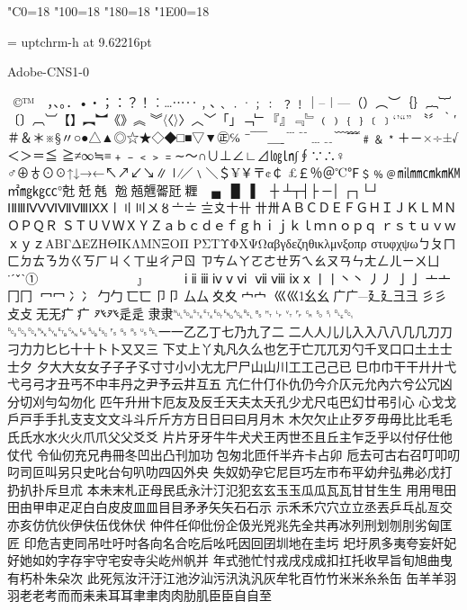%
%
%
%
\kcatcode"C0=18%
\kcatcode"100=18%
\kcatcode"180=18%
\kcatcode"1E00=18%

\font\uptchrm = uptchrm-h at 9.62216pt
\uptchrm


Adobe-CNS1-0

 ©™　，、。．•‧；：？！︰…⋯‥﹐､﹑﹒·﹔﹕
﹖﹗｜–︱—（）︵︶｛｝︷︸〔〕︹︺【】︻︼《》︽
︾〈〈〉〉︿﹀「」﹁﹂『』﹃﹄﹙﹚﹛﹜﹝﹞‘’“”
〝〞‵′＃＆＊※§〃○●△▲◎☆★◇◆□■▽▼㊣℅
¯̄‾￣＿ˍ﹉﹊﹍﹎﹋﹌﹟﹠﹡＋－×÷±√＜＞＝≦
≧≠∞≒≡﹢﹣﹤﹥﹦∼～∩∪⊥∠∟⊿㏒㏑∫∮∵∴♀
♂⊕♁⊙☉↑↓→←↖↗↙↘∥∣∕／﹨＼＄¥￥〒¢￠
£￡％＠℃℉﹩﹪﹫㏕㎜㎝㎞㏎㎡㎎㎏㏄°兙兛兞
兝兡兣嗧瓩糎▁▂▃▄▅▆▇█▏▎▍▌▋▊▉┼
┴┬┤├▔─│▕┌┐└┘╭╮╰╯◢◣◥◤╱╲╳０１
２３４５６７８９ⅠⅡⅢⅣⅤⅥⅦⅧⅨⅩ〡〢〣〤〥〦〧
〨〩〸卄〹〺ＡＢＣＤＥＦＧＨＩＪＫＬＭＮＯＰＱＲ
ＳＴＵＶＷＸＹＺａｂｃｄｅｆｇｈｉｊｋｌｍｎｏｐｑ
ｒｓｔｕｖｗｘｙｚΑΒΓΔΕΖΗΘΙΚΛΜΝΞΟΠ
ΡΣΤΥΦΧΨΩαβγδεζηθικλμνξοπρ
στυφχψωㄅㄆㄇㄈㄉㄊㄋㄌㄍㄎㄏㄐㄑㄒㄓㄔㄕㄖ
ㄗㄘㄙㄚㄛㄜㄝㄞㄟㄠㄡㄢㄣㄤㄥㄦㄧㄨㄩ˙ˊˇ̌ˋ①
②③④⑤⑥⑦⑧⑨⑩⑴⑵⑶
⑷⑸⑹⑺⑻⑼⑽ⅰⅱⅲⅳⅴⅵ
ⅶⅷⅸⅹ丨⼁丶⼂丿⼃⼅亅⼇亠冂⼌
冖⼍冫⼎⼓勹⼖匸⼙卩⼛厶⼢夊⼧宀
⼮巛幺⼳广⼴廴⼵彐⼹彡⼺⽁攴⽆无疒⽧
癶⽨⾡辵⾪隶␀␁␂␃␄␅␆␇␈␉␊␋␌␍␎␏␐␑
␒␓␔␕␖␗␘␙␚␛␜␝␞␟␡⼀一⼄乙丁七乃九了⼆
二人⼈儿⼉入⼊八⼋⼏几⼑刀刁⼒力⼔匕十⼗卜⼘⼜又三
下丈上丫丸凡久么也乞于亡兀兀刃勺千叉⼝口土⼟士⼠夕
⼣大⼤女⼥⼦子孑孓寸⼨小⼩尢⼪尸⼫⼭山川工⼯⼰己已
巳巾⼱干⼲廾⼶弋⼷弓⼸才丑丐不中丰丹之尹予云井互五
亢仁什仃仆仇仍今介仄元允內六兮公冗凶分切刈勻勾勿化
匹午升卅卞厄友及反壬天夫太夭孔少尤尺屯巴幻廿弔引心
⼼戈⼽戶⼾手⼿扎⽀支文⽂斗⽃斤⽄方⽅日⽇曰⽈月⽉木
⽊欠⽋止⽌歹⽍毋⽏比⽐毛⽑氏⽒水⽔火⽕爪⽖父⽗爻⽘
片⽚牙⽛牛⽜犬⽝王丙世丕且丘主乍乏乎以付仔仕他仗代
令仙仞充兄冉冊冬凹出凸刊加功包匆北匝仟半卉卡占卯
卮去可古右召叮叩叨叼司叵叫另只史叱台句叭叻四囚外央
失奴奶孕它尼巨巧左市布平幼弁弘弗必戊打扔扒扑斥旦朮
本未末札正母民氐永汁汀氾犯玄⽞玉⽟瓜⽠瓦⽡甘⽢生⽣
⽤用甩⽥田由甲申⽦疋白⽩皮⽪皿⽫目⽬矛⽭矢⽮石⽯示
⽰禾⽲穴⽳立⽴丞丟乒乓乩亙交亦亥仿伉伙伊伕伍伐休伏
仲件任仰仳份企伋光兇兆先全共再冰列刑划刎刖劣匈匡匠
印危吉吏同吊吐吁吋各向名合吃后吆吒因回囝圳地在圭圬
圯圩夙多夷夸妄奸妃好她如妁字存宇守宅安寺尖屹州帆并
年式弛忙忖戎戌戍成扣扛托收早旨旬旭曲曳有朽朴朱朵次
此死氖汝汗汙江池汐汕污汛汍汎灰牟牝百竹⽵米⽶糸⽷缶
⽸羊⽺羽⽻老⽼考而⽽耒⽾耳⽿聿⾀肉⾁肋肌臣⾂自⾃至
